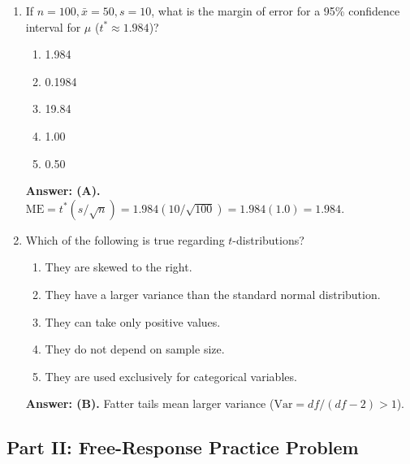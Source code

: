 \begin{enumerate}[resume, leftmargin=1.5em]
  \item If $n = 100, \bar{x} = 50, s = 10$, what is the margin of error for a 95\% confidence interval for $\mu$ ($t^* \approx 1.984$)?
  \begin{enumerate}[label=(\Alph*)]
    \item 1.984 \item 0.1984 \item 19.84 \item 1.00 \item 0.50
  \end{enumerate}
  \textbf{Answer: (A).} $\text{ME} = t^*(s/\sqrt{n}) = 1.984(10/\sqrt{100}) = 1.984(1.0) = 1.984$.

  \item Which of the following is true regarding $t$-distributions?
  \begin{enumerate}[label=(\Alph*)]
    \item They are skewed to the right.
    \item They have a larger variance than the standard normal distribution.
    \item They can take only positive values.
    \item They do not depend on sample size.
    \item They are used exclusively for categorical variables.
  \end{enumerate}
  \textbf{Answer: (B).} Fatter tails mean larger variance ($\text{Var} = df/(df-2) > 1$).
\end{enumerate}

\subsection*{Part II: Free-Response Practice Problem}

